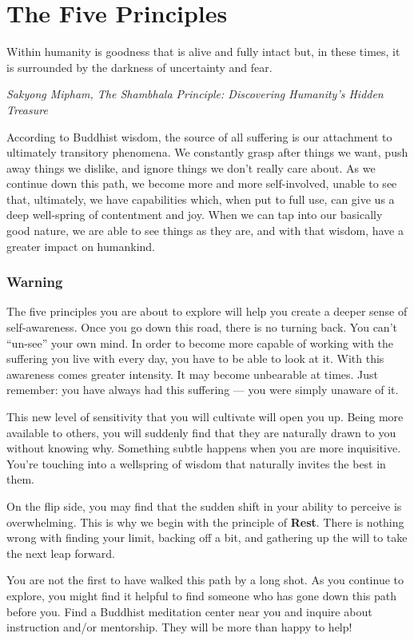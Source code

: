 \chapter{The Five Principles}
\epigraph{Within humanity is goodness that is alive and fully intact but, in these times, it is surrounded by the darkness of uncertainty and fear.}{\textit{Sakyong Mipham, The Shambhala Principle: Discovering Humanity's Hidden Treasure}}

According to Buddhist wisdom, the source of all suffering is our attachment to ultimately transitory phenomena. 
We constantly grasp after things we want, push away things we dislike, and ignore things we don't really
care about. As we continue down this path, we become more and more self-involved, unable to see that,
ultimately, we have capabilities which, when put to full use, can give us a deep well-spring of contentment
and joy. When we can tap into our basically good nature, we are able to see things as they are,
and with that wisdom, have a greater impact on humankind.

\subsection{Warning}

The five principles you are about to explore will help you create a deeper sense of self-awareness. Once you
go down this road, there is no turning back. You can't ``un-see'' your own mind. In order to become more
capable of working with the suffering you live with every day, you have to be able to look at it. With this
awareness comes greater intensity. It may become unbearable at times. Just remember: you have always
had this suffering --- you were simply unaware of it.

This new level of sensitivity that you will cultivate will open you up. Being more available to others, you
will suddenly find that they are naturally drawn to you without knowing why. Something subtle happens when
you are more inquisitive. You're touching into a wellspring of wisdom that naturally invites the best in them.

On the flip side, you may find that the sudden shift in your ability to perceive is overwhelming. This is why
we begin with the principle of \textbf{Rest}. There is nothing wrong with finding your limit, backing off a bit, 
and gathering up the will to take the next leap forward. 

You are not the first to have walked this path by a long shot. As you continue to explore, you might find
it helpful to find someone who has gone down this path before you. Find a Buddhist meditation center near
you and inquire about instruction and/or mentorship. They will be more than happy to help!

